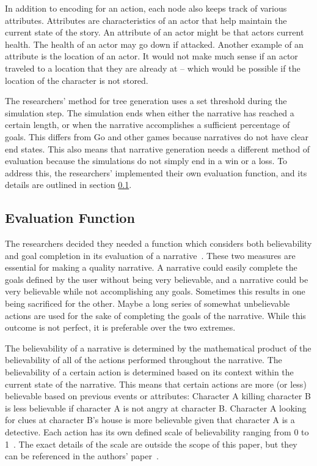 \documentclass{sig-alternate}
\begin{document}
In addition to encoding for an action, each node also keeps track of various attributes. Attributes are characteristics of an actor that help maintain the current state of the story. An attribute of an actor might be that actors current health. The health of an actor may go down if attacked. Another example of an attribute is the location of an actor. It would not make much sense if an actor traveled to a location that they are already at -- which would be possible if the location of the character is not stored.

The researchers' method for tree generation uses a set threshold during the simulation step. The simulation ends when either the narrative has reached a certain length, or when the narrative accomplishes a sufficient percentage of goals. This differs from Go and other games because narratives do not have clear end states. This also means that narrative generation needs a different method of evaluation because the simulations do not simply end in a win or a loss. To address this, the researchers' implemented their own evaluation function, and its details are outlined in section \ref{sec:EvalFunction}. 

\subsection{Evaluation Function}\label{sec:EvalFunction}
The researchers decided they needed a function which considers both believability and goal completion in its evaluation of a narrative~\cite{Narrative}. These two measures are essential for making a quality narrative. A narrative could easily complete the goals defined by the user without being very believable, and a narrative could be very believable while not accomplishing any goals. Sometimes this results in one being sacrificed for the other. Maybe a long series of somewhat unbelievable actions are used for the sake of completing the goals of the narrative. While this outcome is not perfect, it is preferable over the two extremes.

The believability of a narrative is determined by the mathematical product of the believability of all of the actions performed throughout the narrative. The believability of a certain action is determined based on its context within the current state of the narrative. This means that certain actions are more (or less) believable based on previous events or attributes: Character A killing character B is less believable if character A is not angry at character B. Character A looking for clues at character B's house is more believable given that character A is a detective. Each action has its own defined scale of believability ranging from 0 to 1~\cite{Narrative}. The exact details of the scale are outside the scope of this paper, but they can be referenced in the authors' paper~\cite{Narrative}.
\end{document}
